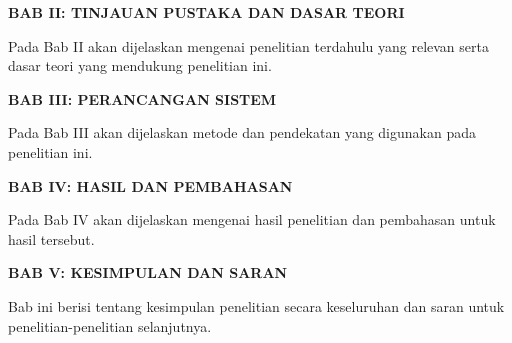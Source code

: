 \documentclass[../thesis.tex]{subfiles}
\begin{document}
\begin{flushleft}
    \textbf{BAB II: TINJAUAN PUSTAKA DAN DASAR TEORI} 
\end{flushleft}
\par
Pada Bab II akan dijelaskan mengenai penelitian terdahulu yang relevan serta dasar teori
yang mendukung penelitian ini.

\begin{flushleft}
    \textbf{BAB III: PERANCANGAN SISTEM} 
\end{flushleft}
\par
Pada Bab III akan dijelaskan metode dan pendekatan yang digunakan pada penelitian ini. 

\begin{flushleft}
    \textbf{BAB IV: HASIL DAN PEMBAHASAN} 
\end{flushleft}
\par
Pada Bab IV akan dijelaskan mengenai hasil penelitian dan pembahasan untuk hasil tersebut.

\begin{flushleft}
    \textbf{BAB V: KESIMPULAN DAN SARAN} 
\end{flushleft}
\par
Bab ini berisi tentang kesimpulan penelitian secara keseluruhan dan saran untuk
penelitian-penelitian selanjutnya.
\end{document}
